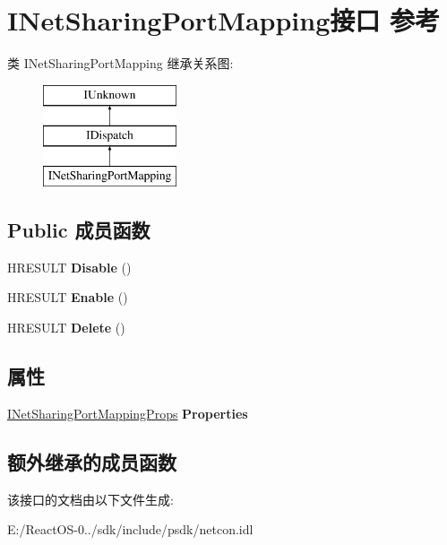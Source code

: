 \hypertarget{interface_i_net_sharing_port_mapping}{}\section{I\+Net\+Sharing\+Port\+Mapping接口 参考}
\label{interface_i_net_sharing_port_mapping}
类 I\+Net\+Sharing\+Port\+Mapping 继承关系图\+:\begin{figure}[H]
\begin{center}
\leavevmode
\includegraphics[height=3.000000cm]{interface_i_net_sharing_port_mapping}
\end{center}
\end{figure}
\subsection*{Public 成员函数}
\begin{DoxyCompactItemize}
\item 
\mbox{\label{interface_i_net_sharing_port_mapping_a02210aec96e369b2887461038335a871}} 
H\+R\+E\+S\+U\+LT {\bfseries Disable} ()
\item 
\mbox{\label{interface_i_net_sharing_port_mapping_a673b4377099e53de965c8f8e0ff0b15c}} 
H\+R\+E\+S\+U\+LT {\bfseries Enable} ()
\item 
\mbox{\label{interface_i_net_sharing_port_mapping_a30f2eb4447249ba7dda0098bbd57d00f}} 
H\+R\+E\+S\+U\+LT {\bfseries Delete} ()
\end{DoxyCompactItemize}
\subsection*{属性}
\begin{DoxyCompactItemize}
\item 
\mbox{\label{interface_i_net_sharing_port_mapping_a886af2ce854524e36982099acd23d912}} 
\hyperlink{interface_i_net_sharing_port_mapping_props}{I\+Net\+Sharing\+Port\+Mapping\+Props} {\bfseries Properties}
\end{DoxyCompactItemize}
\subsection*{额外继承的成员函数}


该接口的文档由以下文件生成\+:\begin{DoxyCompactItemize}
\item 
E\+:/\+React\+O\+S-\/0../sdk/include/psdk/netcon.\+idl\end{DoxyCompactItemize}

